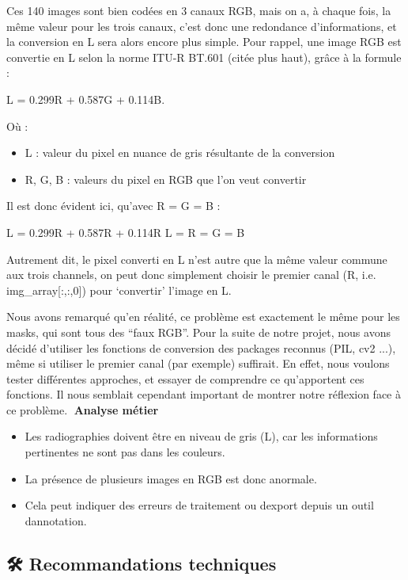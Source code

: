 Ces 140 images sont bien codées en 3 canaux RGB, mais on a, à chaque
fois, la même valeur pour les trois canaux, c'est donc une redondance
d'informations, et la conversion en L sera alors encore plus simple.
Pour rappel, une image RGB est convertie en L selon la norme ITU-R
BT.601 (citée plus haut), grâce à la formule :

L = 0.299R + 0.587G + 0.114B.

Où :

\begin{itemize}
\tightlist
\item
  L : valeur du pixel en nuance de gris résultante de la conversion
\item
  R, G, B : valeurs du pixel en RGB que l'on veut convertir
\end{itemize}

Il est donc évident ici, qu'avec R = G = B :

L = 0.299R + 0.587R + 0.114R L = R = G = B

Autrement dit, le pixel converti en L n'est autre que la même valeur
commune aux trois channels, on peut donc simplement choisir le premier
canal (R, i.e. img\_array{[}:,:,0{]}) pour `convertir' l'image en L.

Nous avons remarqué qu'en réalité, ce problème est exactement le même
pour les masks, qui sont tous des ``faux RGB''. Pour la suite de notre
projet, nous avons décidé d'utiliser les fonctions de conversion des
packages reconnus (PIL, cv2 ...), même si utiliser le premier canal (par
exemple) suffirait. En effet, nous voulons tester différentes approches,
et essayer de comprendre ce qu'apportent ces fonctions. Il nous semblait
cependant important de montrer notre réflexion face à ce
problème.\protect{}\label{anchor-16}{}\protect{}\label{anchor-17}{}\protect{}\label{anchor-18}{}🧠
\textbf{Analyse métier}

\begin{itemize}
\tightlist
\item
  Les radiographies doivent être en niveau de gris (L), car les
  informations pertinentes ne sont pas dans les couleurs.
\item
  La présence de plusieurs images en RGB est donc anormale.
\item
  Cela peut indiquer des erreurs de traitement ou
  d\textquotesingle export depuis un outil d\textquotesingle annotation.
\end{itemize}

\subsection[🛠️ \textbf{Recommandations
techniques}]{\texorpdfstring{\protect\hypertarget{anchor-19}{}{}\protect\hypertarget{anchor-20}{}{}\protect\hypertarget{anchor-21}{}{}🛠️
\textbf{Recommandations
techniques}}{🛠️ Recommandations techniques}}\label{recommandations-techniques}

